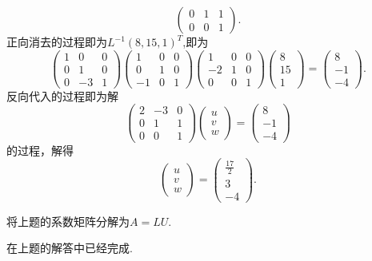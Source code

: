 ﻿\documentclass{book} \usepackage{exsheets} \usepackage{xeCJK}
\begin{document}
\begin{solution}
$$\begin{pmatrix}
  0&1&1\\
  0&0&1
\end{pmatrix}.
$$
正向消去的过程即为$L^{-1}(8,15,1)^T$,即为
$$
\begin{pmatrix}
  1&0&0\\
  0&1&0\\
  0&-3&1
\end{pmatrix}
\begin{pmatrix}
  1&0&0\\
  0&1&0\\
  -1&0&1
\end{pmatrix}
\begin{pmatrix}
  1&0&0\\
  -2&1&0\\
  0&0&1
\end{pmatrix}
\begin{pmatrix}
  8\\
  15\\
  1
\end{pmatrix}=
\begin{pmatrix}
  8\\
  -1\\
  -4
\end{pmatrix}.
$$
反向代入的过程即为解
$$
\begin{pmatrix}
  2&-3&0\\
  0&1&1\\
  0&0&1
\end{pmatrix}
\begin{pmatrix}
  u\\
  v\\
  w
\end{pmatrix}=
\begin{pmatrix}
  8\\
  -1\\
  -4
\end{pmatrix}
$$
的过程，解得
$$
\begin{pmatrix}
  u\\
  v\\
  w
\end{pmatrix}=
\begin{pmatrix}
  \frac{17}{2}\\
  3\\
  -4
\end{pmatrix}.
$$
\end{solution}
\begin{question}
  将上题的系数矩阵分解为$A=LU$.
\end{question}
\begin{solution}
  在上题的解答中已经完成.
\end{solution}
\end{document}
